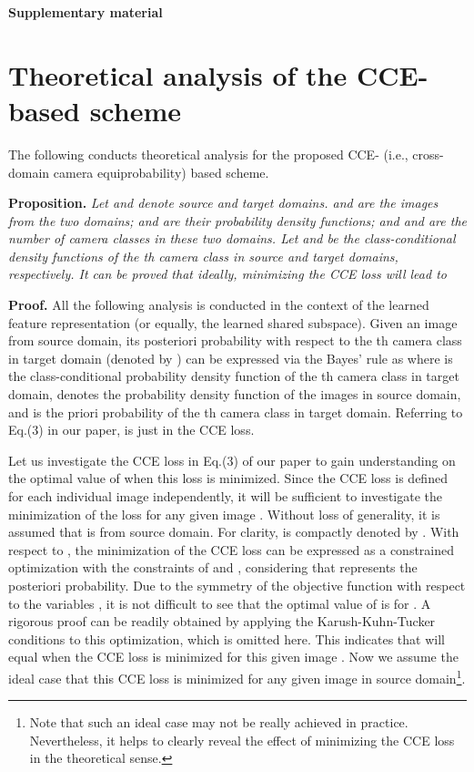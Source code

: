 \documentclass[10pt,twocolumn,letterpaper]{article}
\begin{document}
{\small


}

\textbf{\LARGE{Supplementary material}}







\setcounter{equation}{7}
\renewcommand\thesection{A1}
\section{Theoretical analysis of the CCE-based scheme}

The following conducts theoretical analysis for the proposed CCE- (i.e., cross-domain camera equiprobability) based scheme. 



\textbf{Proposition.} \textit{Let  and  denote source and target domains.  and  are the images from the two domains;  and  are their probability density functions; and  and  are the number of camera classes in these two domains. Let  and  be the class-conditional density functions of the th camera class in source and target domains, respectively. It can be proved that ideally, minimizing the CCE loss will lead to}


\textbf{Proof.} All the following analysis is conducted in the context of the learned feature representation (or equally, the learned shared subspace). Given an image  from source domain, its posteriori probability with respect to the th camera class in target domain (denoted by ) can be expressed via the Bayes' rule as 
where  is the class-conditional probability density function of the th camera class in target domain,  denotes the probability density function of the images in source domain, and  is the priori probability of the th camera class in target domain. Referring to Eq.(3) in our paper,  is just  in the CCE loss. 

Let us investigate the CCE loss in Eq.(3) of our paper to gain understanding on the optimal value of  when this loss is minimized. Since the CCE loss is defined for each individual image  independently, it will be sufficient to investigate the minimization of the loss for any given image . Without loss of generality, it is assumed that  is from source domain. For clarity,  is compactly denoted by . With respect to , the minimization of the CCE loss can be expressed as a constrained optimization 
 with the constraints of  and , considering that  represents the posteriori probability. Due to the symmetry of the objective function with respect to the variables , it is not difficult to see that the optimal value of  is  for . A rigorous proof can be readily obtained by applying the Karush-Kuhn-Tucker conditions to this optimization, which is omitted here. This indicates that  will equal  when the CCE loss is minimized for this given image . Now we assume the ideal case that this CCE loss is minimized for any given image  in source domain\footnote{Note that such an ideal case may not be really achieved in practice. Nevertheless, it helps to clearly reveal the effect of minimizing the CCE loss in the theoretical sense.}.   
\end{document}
